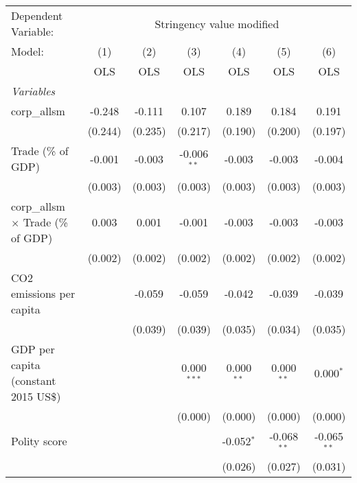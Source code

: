 
\begingroup
\centering
\begin{tabular}{lcccccc}
   \toprule
   Dependent Variable: & \multicolumn{6}{c}{Stringency value modified}\\
   Model:                                    & (1)     & (2)     & (3)           & (4)          & (5)           & (6)\\  
                                             &  OLS    & OLS     & OLS           & OLS          & OLS           & OLS\\  
   \midrule
   \emph{Variables}\\
   corp\_allsm                               & -0.248  & -0.111  & 0.107         & 0.189        & 0.184         & 0.191\\   
                                             & (0.244) & (0.235) & (0.217)       & (0.190)      & (0.200)       & (0.197)\\   
   Trade (\% of GDP)                         & -0.001  & -0.003  & -0.006$^{**}$ & -0.003       & -0.003        & -0.004\\   
                                             & (0.003) & (0.003) & (0.003)       & (0.003)      & (0.003)       & (0.003)\\   
   corp\_allsm $\times$ Trade (\% of GDP)    & 0.003   & 0.001   & -0.001        & -0.003       & -0.003        & -0.003\\   
                                             & (0.002) & (0.002) & (0.002)       & (0.002)      & (0.002)       & (0.002)\\   
   CO2 emissions per capita                  &         & -0.059  & -0.059        & -0.042       & -0.039        & -0.039\\   
                                             &         & (0.039) & (0.039)       & (0.035)      & (0.034)       & (0.035)\\   
   GDP per capita (constant 2015 US\$)       &         &         & 0.000$^{***}$ & 0.000$^{**}$ & 0.000$^{**}$  & 0.000$^{*}$\\   
                                             &         &         & (0.000)       & (0.000)      & (0.000)       & (0.000)\\   
   Polity score                              &         &         &               & -0.052$^{*}$ & -0.068$^{**}$ & -0.065$^{**}$\\   
                                             &         &         &               & (0.026)      & (0.027)       & (0.031)\\   

\end{tabular}
